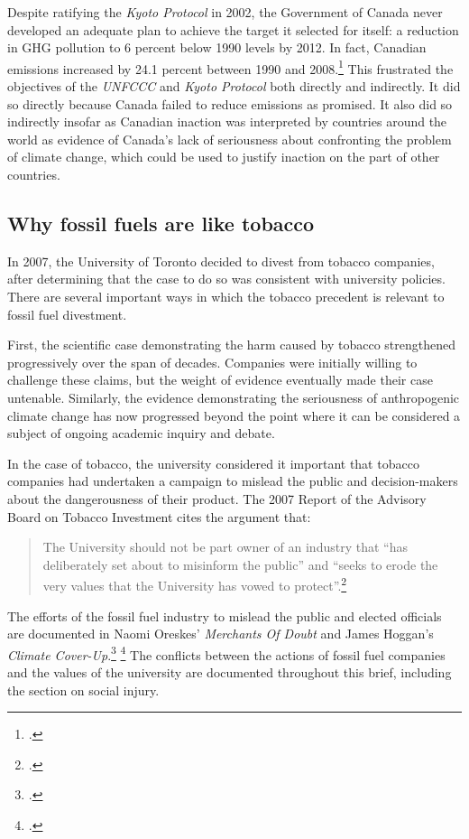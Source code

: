 Despite ratifying the \emph{Kyoto Protocol} in 2002, the Government of Canada never developed an adequate plan to achieve the target it selected for itself: a reduction in GHG pollution to 6 percent below 1990 levels by 2012.
In fact, Canadian emissions increased by 24.1 percent between 1990 and 2008.\footcite[][p. 3]{UNFCCCCanada2010}
This frustrated the objectives of the \emph{UNFCCC} and \emph{Kyoto Protocol} both directly and indirectly.
It did so directly because Canada failed to reduce emissions as promised.
It also did so indirectly insofar as Canadian inaction was interpreted by countries around the world as evidence of Canada's lack of seriousness about confronting the problem of climate change, which could be used to justify inaction on the part of other countries. 



	\subsection{Why fossil fuels are like tobacco}
	\label{sec:LikeTobacco}



In 2007, the University of Toronto decided to divest from tobacco companies, after determining that the case to do so was consistent with university policies.
There are several important ways in which the tobacco precedent is relevant to fossil fuel divestment.



First, the scientific case demonstrating the harm caused by tobacco strengthened progressively over the span of decades.
Companies were initially willing to challenge these claims, but the weight of evidence eventually made their case untenable.
Similarly, the evidence demonstrating the seriousness of anthropogenic climate change has now progressed beyond the point where it can be considered a subject of ongoing academic inquiry and debate.



In the case of tobacco, the university considered it important that tobacco companies had undertaken a campaign to mislead the public and decision-makers about the dangerousness of their product.
The 2007 Report of the Advisory Board on Tobacco Investment cites the argument that:
\begin{quote}
The University should not be part owner of an industry that ``has deliberately set about to misinform the public'' and ``seeks to erode the very values that the University has vowed to protect''.\footcite[][p. 5]{TobaccoReport_2007}
\end{quote}
The efforts of the fossil fuel industry to mislead the public and elected officials are documented in Naomi Oreskes' \emph{Merchants Of Doubt} and James Hoggan's \emph{Climate Cover-Up}.\footcite[][]{MerchantsDoubt} \footcite[][]{ClimateCoverUp}
The conflicts between the actions of fossil fuel companies and the values of the university are documented throughout this brief, including the section on social injury.



